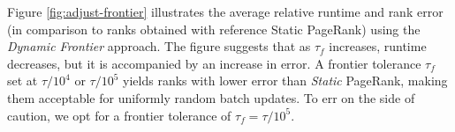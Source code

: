 Figure \ref{fig:adjust-frontier} illustrates the average relative runtime and rank error (in comparison to ranks obtained with reference Static PageRank) using the \textit{Dynamic Frontier} approach. The figure suggests that as $\tau_f$ increases, runtime decreases, but it is accompanied by an increase in error. A frontier tolerance $\tau_f$ set at $\tau/10^4$ or $\tau/10^5$ yields ranks with lower error than \textit{Static} PageRank, making them acceptable for uniformly random batch updates. To err on the side of caution, we opt for a frontier tolerance of $\tau_f = \tau/10^5$.







